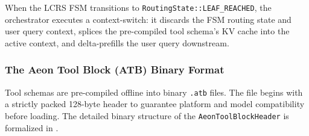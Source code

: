 \documentclass[conference,10pt]{IEEEtran}
\begin{document}
When the LCRS FSM transitions to \texttt{RoutingState::LEAF\_REACHED}, the orchestrator executes a context-switch: it discards the FSM routing state and user query context, splices the pre-compiled tool schema's KV cache into the active context, and delta-prefills the user query downstream.

\subsubsection{The Aeon Tool Block (ATB) Binary Format}
Tool schemas are pre-compiled offline into binary \texttt{.atb} files. The file begins with a strictly packed 128-byte header to guarantee platform and model compatibility before loading. The detailed binary structure of the \texttt{AeonToolBlockHeader} is formalized in .
\end{document}
